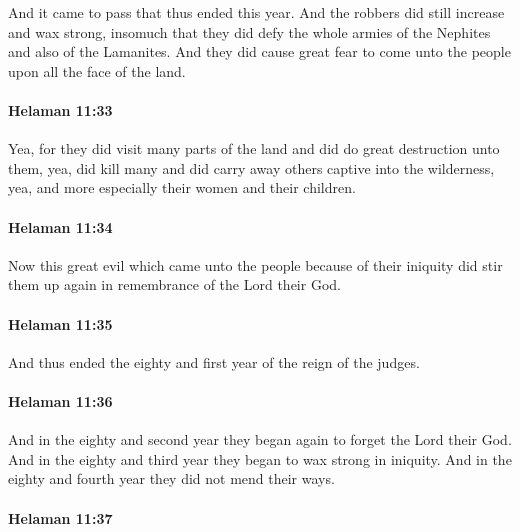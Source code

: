 			And it came to pass that thus ended this year.
			And the robbers did still increase and wax strong,
			insomuch that they did defy the whole armies of the Nephites
			and also of the Lamanites.
			And they did cause great fear to come unto the people
			upon all the face of the land.

		\paragraph{Helaman 11:33} %
			\label{HELAMAN-11-33}

			Yea, for they did visit many parts of the land
			and did do great destruction unto them,
			yea, did kill many and did carry away others captive into the wilderness,
			yea, and more especially their women and their children.

		\paragraph{Helaman 11:34} %
			\label{HELAMAN-11-34}

			Now this great evil which came unto the people because of their iniquity
			did stir them up again in remembrance of the Lord their God.

		\paragraph{Helaman 11:35} %
			\label{HELAMAN-11-35}

			And thus ended the eighty and first year of the reign of the judges.

		\paragraph{Helaman 11:36} %
			\label{HELAMAN-11-36}

			And in the eighty and second year
			they began again to forget the Lord their God.
			And in the eighty and third year
			they began to wax strong in iniquity.
			And in the eighty and fourth year they did not mend their ways.

		\paragraph{Helaman 11:37} %
			\label{HELAMAN-11-37}

